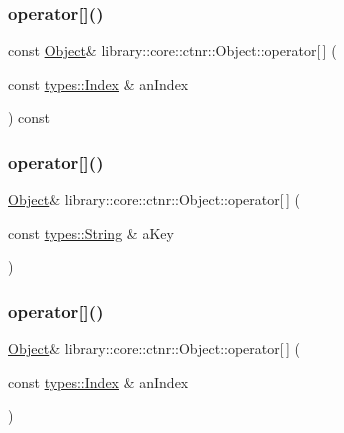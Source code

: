 \subsubsection{\texorpdfstring{operator[]()}{operator[]()}\hspace{0.1cm}{\footnotesize\ttfamily [2/4]}}
{\footnotesize\ttfamily const \hyperlink{classlibrary_1_1core_1_1ctnr_1_1Object}{Object}\& library\+::core\+::ctnr\+::\+Object\+::operator\mbox{[}$\,$\mbox{]} (\begin{DoxyParamCaption}\item[{const \hyperlink{namespacelibrary_1_1core_1_1types_ad87eeb821d7067ec94e06ed1980d6350}{types\+::\+Index} \&}]{an\+Index }\end{DoxyParamCaption}) const}

\mbox{\label{classlibrary_1_1core_1_1ctnr_1_1Object_ab5ef00d90b9b88c0dea26f38050a1224}} 
\subsubsection{\texorpdfstring{operator[]()}{operator[]()}\hspace{0.1cm}{\footnotesize\ttfamily [3/4]}}
{\footnotesize\ttfamily \hyperlink{classlibrary_1_1core_1_1ctnr_1_1Object}{Object}\& library\+::core\+::ctnr\+::\+Object\+::operator\mbox{[}$\,$\mbox{]} (\begin{DoxyParamCaption}\item[{const \hyperlink{classlibrary_1_1core_1_1types_1_1String}{types\+::\+String} \&}]{a\+Key }\end{DoxyParamCaption})}

\mbox{\label{classlibrary_1_1core_1_1ctnr_1_1Object_a20fbb0cb8c3f2eacbc9ae67999cb6a89}} 
\subsubsection{\texorpdfstring{operator[]()}{operator[]()}\hspace{0.1cm}{\footnotesize\ttfamily [4/4]}}
{\footnotesize\ttfamily \hyperlink{classlibrary_1_1core_1_1ctnr_1_1Object}{Object}\& library\+::core\+::ctnr\+::\+Object\+::operator\mbox{[}$\,$\mbox{]} (\begin{DoxyParamCaption}\item[{const \hyperlink{namespacelibrary_1_1core_1_1types_ad87eeb821d7067ec94e06ed1980d6350}{types\+::\+Index} \&}]{an\+Index }\end{DoxyParamCaption})}

